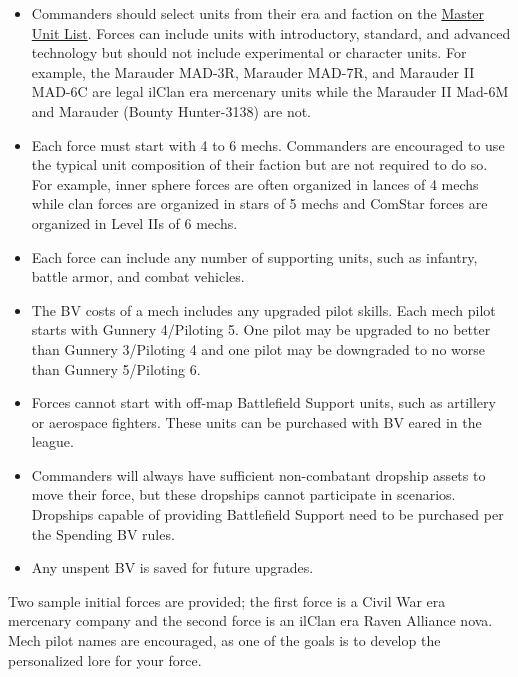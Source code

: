 \documentclass[UTF8]{article}
\begin{document}
\begin{itemize}

\item Commanders should select units from their era and faction on the \href{http://www.masterunitlist.info/}{Master Unit List}.
Forces can include units with introductory, standard, and advanced technology but should not include experimental or character units.
For example, the Marauder MAD-3R, Marauder MAD-7R, and Marauder II MAD-6C are legal ilClan era mercenary units while the Marauder II Mad-6M and Marauder (Bounty Hunter-3138) are not.

\item Each force must start with 4 to 6 mechs.
Commanders are encouraged to use the typical unit composition of their faction but are not required to do so.
For example, inner sphere forces are often organized in lances of 4 mechs while clan forces are organized in stars of 5 mechs and ComStar forces are organized in Level IIs of 6 mechs.

\item Each force can include any number of supporting units, such as infantry, battle armor, and combat vehicles.

\item The BV costs of a mech includes any upgraded pilot skills.
Each mech pilot starts with Gunnery 4/Piloting 5.
One pilot may be upgraded to no better than Gunnery 3/Piloting 4 and one pilot may be downgraded to no worse than Gunnery 5/Piloting 6.

\item Forces cannot start with off-map Battlefield Support units, such as artillery or aerospace fighters.
These units can be purchased with BV eared in the league.

\item Commanders will always have sufficient non-combatant dropship assets to move their force, but these dropships cannot participate in scenarios.
Dropships capable of providing Battlefield Support need to be purchased per the Spending BV rules.

\item Any unspent BV is saved for future upgrades.

\end{itemize}

Two sample initial forces are provided; the first force is a Civil War era mercenary company and the second force is an ilClan era Raven Alliance nova.
Mech pilot names are encouraged, as one of the goals is to develop the personalized lore for your force.\\
\end{document}
